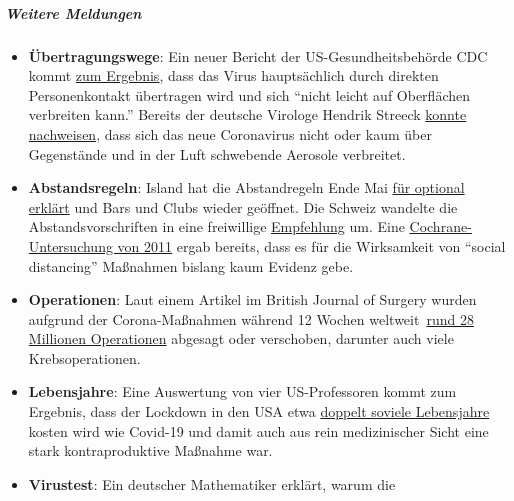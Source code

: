 \hypertarget{weitere-meldungen-1}{%
\subparagraph{\texorpdfstring{\textbf{Weitere
Meldungen}}{Weitere Meldungen}}\label{weitere-meldungen-1}}

\begin{itemize}
\tightlist
\item
  \textbf{Übertragungswege}: Ein neuer Bericht der US-Gesundheitsbehörde
  CDC kommt
  \href{https://www.yahoo.com/lifestyle/cdc-coronavirus-mainly-spreads-through-persontoperson-contact-and-does-not-spread-easily-on-contaminated-surfaces-153317029.html}{zum
  Ergebnis}, dass das Virus hauptsächlich durch direkten Personenkontakt
  übertragen wird und sich ``nicht leicht auf Oberflächen verbreiten
  kann.'' Bereits der deutsche Virologe Hendrik Streeck
  \href{https://www.telegraph.co.uk/news/2020/04/02/no-proof-coronavirus-can-spread-shopping-says-leading-german/}{konnte
  nachweisen}, dass sich das neue Coronavirus nicht oder kaum über
  Gegenstände und in der Luft schwebende Aerosole verbreitet.
\item
  \textbf{Abstandsregeln}: Island hat die Abstandregeln Ende Mai
  \href{https://icelandmonitor.mbl.is/news/news/2020/05/25/two_meter_rule_optional_in_iceland/}{für
  optional erklärt} und Bars und Clubs wieder geöffnet. Die Schweiz
  wandelte die Abstandsvorschriften in eine freiwillige
  \href{https://www.20min.ch/story/bund-schafft-die-2-meter-abstands-busse-heimlich-ab-763738047957}{Empfehlung}
  um. Eine
  \href{https://www.cochranelibrary.com/cdsr/doi/10.1002/14651858.CD006207.pub4/full}{Cochrane-Untersuchung
  von 2011} ergab bereits, dass es für die Wirksamkeit von ``social
  distancing'' Maßnahmen bislang kaum Evidenz gebe.
\item
  \textbf{Operationen}: Laut einem Artikel im British Journal of Surgery
  wurden aufgrund der Corona-Maßnahmen während 12 Wochen
  weltweit~\href{https://bjssjournals.onlinelibrary.wiley.com/doi/abs/10.1002/bjs.11746}{rund
  28 Millionen Operationen} abgesagt oder verschoben, darunter auch
  viele Krebsoperationen.
\item
  \textbf{Lebensjahre}: Eine Auswertung von vier US-Professoren kommt
  zum Ergebnis, dass der Lockdown in den USA etwa
  \href{https://thehill.com/opinion/healthcare/499394-the-covid-19-shutdown-will-cost-americans-millions-of-years-of-life}{doppelt
  soviele Lebensjahre} kosten wird wie Covid-19 und damit auch aus rein
  medizinischer Sicht eine stark kontraproduktive Maßnahme war.
\item
  \textbf{Virustest}: Ein deutscher Mathematiker erklärt, warum die

\end{itemize}
